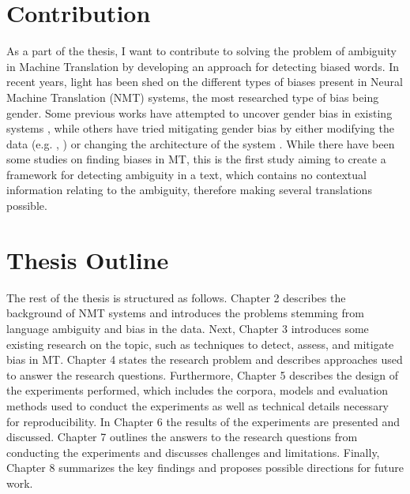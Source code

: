 \section{Contribution}
\label{sec:Introduction:Contribution}

As a part of the thesis, I want to contribute to solving the problem of ambiguity in Machine Translation by developing an approach for detecting biased words. In recent years, light has been shed on the different types of biases present in Neural Machine Translation (NMT) systems, the most researched type of bias being gender. Some previous works have attempted to uncover gender bias in existing systems \parencite{Prates_2019}, while others have tried mitigating gender bias by either modifying the data (e.g. \cite{Escud_Font_2019}, \cite{Stanovsky_2019}) or changing the architecture of the system \parencite{Vanmassenhove_2018}. While there have been some studies on finding biases in MT, this is the first study aiming to create a framework for detecting ambiguity in a text, which contains no contextual information relating to the ambiguity, therefore making several translations possible.


\section{Thesis Outline}
\label{sec:Introduction:Outline}
The rest of the thesis is structured as follows. Chapter 2 describes the background of NMT systems and introduces the problems stemming from language ambiguity and bias in the data. Next, Chapter 3 introduces some existing research on the topic, such as techniques to detect, assess, and mitigate bias in MT. Chapter 4 states the research problem and describes approaches used to answer the research questions. Furthermore, Chapter 5 describes the design of the experiments performed, which includes the corpora, models and evaluation methods used to conduct the experiments as well as technical details necessary for reproducibility. In Chapter 6 the results of the experiments are presented and discussed. Chapter 7 outlines the answers to the research questions from conducting the experiments and discusses challenges and limitations. Finally, Chapter 8 summarizes the key findings and proposes possible directions for future work.